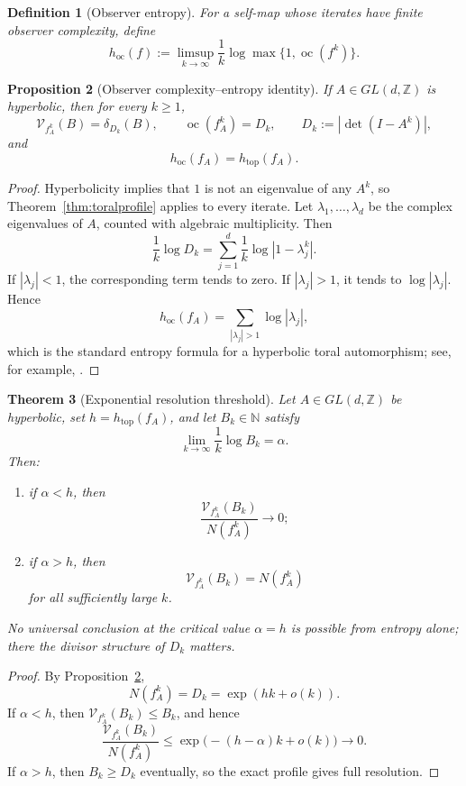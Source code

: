 \documentclass[11pt]{article}
\newtheorem{theorem}{Theorem}[section]
\newtheorem{proposition}[theorem]{Proposition}
\newtheorem{definition}[theorem]{Definition}
\DeclareMathOperator{\oc}{oc}
\newcommand{\VN}{\mathcal V}
\newcommand{\Z}{\mathbb Z}
\newcommand{\N}{\mathbb N}
\begin{document}
\begin{definition}[Observer entropy]
For a self-map whose iterates have finite observer complexity, define
\[
  h_{\mathrm{oc}}(f)
  :=\limsup_{k\to\infty}
  \frac1k\log\max\{1,\oc(f^k)\}.
\]
\end{definition}

\begin{proposition}[Observer complexity--entropy identity]
\label{prop:entropy}
If $A\in GL(d,\Z)$ is hyperbolic, then for every $k\ge1$,
\[
  \VN_{f_A^k}(B)
  =\delta_{D_k}(B),
  \qquad
  \oc(f_A^k)=D_k,
  \qquad
  D_k:=|\det(I-A^k)|,
\]
and
\[
  h_{\mathrm{oc}}(f_A)=h_{\mathrm{top}}(f_A).
\]
\end{proposition}

\begin{proof}
Hyperbolicity implies that $1$ is not an eigenvalue of any $A^k$, so
Theorem~\ref{thm:toralprofile} applies to every iterate.  Let
$\lambda_1,\dots,\lambda_d$ be the complex eigenvalues of $A$, counted with
algebraic multiplicity.  Then
\[
  \frac1k\log D_k
  =\sum_{j=1}^d\frac1k\log|1-\lambda_j^k|.
\]
If $|\lambda_j|<1$, the corresponding term tends to zero.  If
$|\lambda_j|>1$, it tends to $\log|\lambda_j|$.  Hence
\[
  h_{\mathrm{oc}}(f_A)
  =\sum_{|\lambda_j|>1}\log|\lambda_j|,
\]
which is the standard entropy formula for a hyperbolic toral automorphism;
see, for example, \cite{Walters}.
\end{proof}

\begin{theorem}[Exponential resolution threshold]
\label{thm:threshold}
Let $A\in GL(d,\Z)$ be hyperbolic, set $h=h_{\mathrm{top}}(f_A)$, and let
$B_k\in\N$ satisfy
\[
  \lim_{k\to\infty}\frac1k\log B_k=\alpha.
\]
Then:
\begin{enumerate}[label=(\roman*)]
\item if $\alpha<h$, then
      \[
        \frac{\VN_{f_A^k}(B_k)}{N(f_A^k)}\longrightarrow0;
      \]
\item if $\alpha>h$, then
      \[
        \VN_{f_A^k}(B_k)=N(f_A^k)
      \]
      for all sufficiently large $k$.
\end{enumerate}
No universal conclusion at the critical value $\alpha=h$ is possible from
entropy alone; there the divisor structure of $D_k$ matters.
\end{theorem}

\begin{proof}
By Proposition~\ref{prop:entropy},
\[
  N(f_A^k)=D_k=\exp(hk+o(k)).
\]
If $\alpha<h$, then $\VN_{f_A^k}(B_k)\le B_k$, and hence
\[
  \frac{\VN_{f_A^k}(B_k)}{N(f_A^k)}
  \le\exp\bigl(-(h-\alpha)k+o(k)\bigr)\longrightarrow0.
\]
If $\alpha>h$, then $B_k\ge D_k$ eventually, so the exact profile gives full
resolution.
\end{proof}
\end{document}
